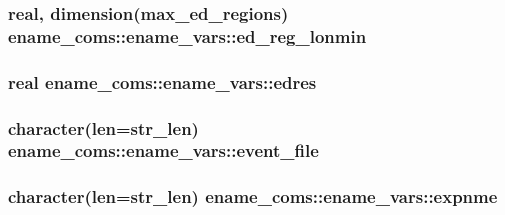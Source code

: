 \subsubsection[{ed\+\_\+reg\+\_\+lonmin}]{\setlength{\rightskip}{0pt plus 5cm}real, dimension(max\+\_\+ed\+\_\+regions) ename\+\_\+coms\+::ename\+\_\+vars\+::ed\+\_\+reg\+\_\+lonmin}\label{structename__coms_1_1ename__vars_aefda5886f022371934a180b6115bebd6}
\hypertarget{structename__coms_1_1ename__vars_ad0785dccc376081a8249a9d2f4ddc43d}{}
\subsubsection[{edres}]{\setlength{\rightskip}{0pt plus 5cm}real ename\+\_\+coms\+::ename\+\_\+vars\+::edres}\label{structename__coms_1_1ename__vars_ad0785dccc376081a8249a9d2f4ddc43d}
\hypertarget{structename__coms_1_1ename__vars_a02891d892272c9dee04feae31b7858aa}{}
\subsubsection[{event\+\_\+file}]{\setlength{\rightskip}{0pt plus 5cm}character(len=str\+\_\+len) ename\+\_\+coms\+::ename\+\_\+vars\+::event\+\_\+file}\label{structename__coms_1_1ename__vars_a02891d892272c9dee04feae31b7858aa}
\hypertarget{structename__coms_1_1ename__vars_a970bc05935c2ee24f02591aa0ca5457a}{}
\subsubsection[{expnme}]{\setlength{\rightskip}{0pt plus 5cm}character(len=str\+\_\+len) ename\+\_\+coms\+::ename\+\_\+vars\+::expnme}\label{structename__coms_1_1ename__vars_a970bc05935c2ee24f02591aa0ca5457a}
\hypertarget{structename__coms_1_1ename__vars_a435668b7df87c4c3b26a91c32f46a781}{}
